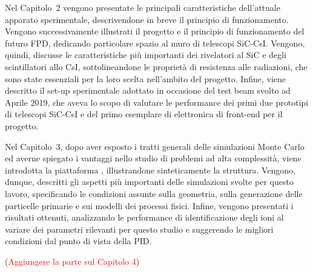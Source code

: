 Nel Capitolo~2 vengono presentate le principali caratteristiche dell'attuale apparato sperimentale, descrivendone in breve il principio di funzionamento.
Vengono successivamente illustrati il progetto e il principio di funzionamento del futuro FPD, dedicando particolare spazio al muro di telescopi SiC-CsI.
Vengono, quindi, discusse le caratteristiche più importanti dei rivelatori al SiC e degli scintillatori allo CsI, sottolineandone le proprietà di resistenza alle radiazioni, che sono state essenziali per la loro scelta nell'ambito del progetto.
Infine, viene descritto il set-up sperimentale adottato in occasione del test beam svolto ad Aprile 2019, che aveva lo scopo di valutare le performance dei primi due prototipi di telescopi SiC-CsI e del primo esemplare di elettronica di front-end per il progetto.

Nel Capitolo~3, dopo aver esposto i tratti generali delle simulazioni Monte Carlo ed averne spiegato i vantaggi nello studio di problemi ad alta complessità, viene introdotta la piattaforma \geant{}, illustrandone sinteticamente la struttura.
Vengono, dunque, descritti gli aspetti più importanti delle simulazioni svolte per questo lavoro, specificando le condizioni assunte sulla geometria, sulla generazione delle particelle primarie e sui modelli dei processi fisici.
Infine, vengono presentati i risultati ottenuti, analizzando le performance di identificazione degli ioni al variare dei parametri rilevanti per questo studio e suggerendo le migliori condizioni dal punto di vista della PID.
 
(\textcolor{red}{Aggiungere la parte sul Capitolo 4})


